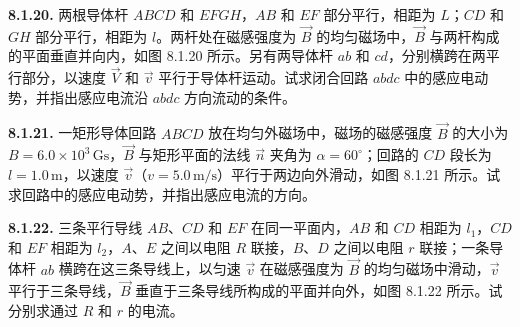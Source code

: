 \begin{center}
\end{center}

\begin{center}
\end{center}

\begin{center}
\end{center}

\vfill
\newpage

\textbf{8.1.20.} 两根导体杆 $ABCD$ 和 $EFGH$，$AB$ 和 $EF$ 部分平行，相距为 $L$；$CD$ 和 $GH$ 部分平行，相距为 $l$。两杆处在磁感强度为 $\vec{B}$ 的均匀磁场中，$\vec{B}$ 与两杆构成的平面垂直并向内，如图 8.1.20 所示。另有两导体杆 $ab$ 和 $cd$，分别横跨在两平行部分，以速度 $\vec{V}$ 和 $\vec{v}$ 平行于导体杆运动。试求闭合回路 $abdc$ 中的感应电动势，并指出感应电流沿 $abdc$ 方向流动的条件。

\begin{center}
\end{center}

\vfill
\newpage

\textbf{8.1.21.} 一矩形导体回路 $ABCD$ 放在均匀外磁场中，磁场的磁感强度 $\vec{B}$ 的大小为 $B = 6.0 \times 10^{3}\,\mathrm{Gs}$，$\vec{B}$ 与矩形平面的法线 $\vec{n}$ 夹角为 $\alpha = 60^{\circ}$；回路的 $CD$ 段长为 $l = 1.0\,\mathrm{m}$，以速度 $\vec{v}$（$v = 5.0\,\mathrm{m/s}$）平行于两边向外滑动，如图 8.1.21 所示。试求回路中的感应电动势，并指出感应电流的方向。

\begin{center}
\end{center}

\vfill
\newpage

\textbf{8.1.22.} 三条平行导线 $AB$、$CD$ 和 $EF$ 在同一平面内，$AB$ 和 $CD$ 相距为 $l_{1}$，$CD$ 和 $EF$ 相距为 $l_{2}$，$A$、$E$ 之间以电阻 $R$ 联接，$B$、$D$ 之间以电阻 $r$ 联接；一条导体杆 $ab$ 横跨在这三条导线上，以匀速 $\vec{v}$ 在磁感强度为 $\vec{B}$ 的均匀磁场中滑动，$\vec{v}$ 平行于三条导线，$\vec{B}$ 垂直于三条导线所构成的平面并向外，如图 8.1.22 所示。试分别求通过 $R$ 和 $r$ 的电流。

\begin{center}
\end{center}

